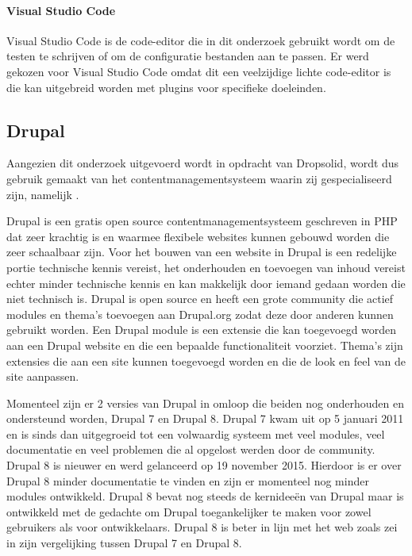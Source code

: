 \paragraph{Visual Studio Code}
Visual Studio Code is de code-editor die in dit onderzoek gebruikt wordt om de testen te schrijven of om de configuratie bestanden aan te passen. Er werd gekozen voor Visual Studio Code omdat dit een veelzijdige lichte code-editor is die kan uitgebreid worden met plugins voor specifieke doeleinden.

\subsection{Drupal}
Aangezien dit onderzoek uitgevoerd wordt in opdracht van Dropsolid, wordt dus gebruik gemaakt van het \gls{contentmanagementsysteem} waarin zij gespecialiseerd zijn, namelijk \textcite{Drupal}.

Drupal is een gratis open source \gls{contentmanagementsysteem} geschreven in PHP dat zeer krachtig is en waarmee flexibele websites kunnen gebouwd worden die zeer schaalbaar zijn. Voor het bouwen van een website in Drupal is een redelijke portie technische kennis vereist, het onderhouden en toevoegen van inhoud vereist echter minder technische kennis en kan makkelijk door iemand gedaan worden die niet technisch is. Drupal is open source en heeft een grote community die actief modules en thema's toevoegen aan Drupal.org zodat deze door anderen kunnen gebruikt worden. Een Drupal module is een extensie die kan toegevoegd worden aan een Drupal website en die een bepaalde functionaliteit voorziet. Thema's zijn extensies die aan een site kunnen toegevoegd worden en die de look en feel van de site aanpassen.

\clearpage
Momenteel zijn er 2 versies van Drupal in omloop die beiden nog onderhouden en ondersteund worden, Drupal 7 en Drupal 8. Drupal 7 kwam uit op 5 januari 2011 en is sinds dan uitgegroeid tot een volwaardig systeem met veel modules, veel documentatie en veel problemen die al opgelost werden door de community. Drupal 8 is nieuwer en werd gelanceerd op 19 november 2015. Hierdoor is er over Drupal 8 minder documentatie te vinden en zijn er momenteel nog minder modules ontwikkeld. Drupal 8 bevat nog steeds de kernideeën van Drupal maar is ontwikkeld met de gedachte om Drupal toegankelijker te maken voor zowel gebruikers als voor ontwikkelaars. Drupal 8 is beter in lijn met het web zoals \textcite{Ramael2015} zei in zijn vergelijking tussen Drupal 7 en Drupal 8.

